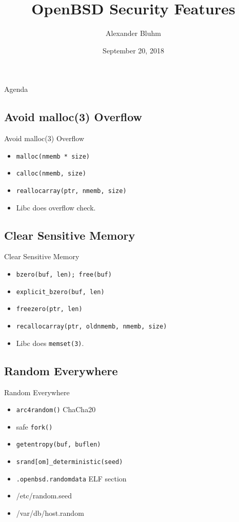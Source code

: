 \documentclass[14pt]{beamer}
\author{Alexander Bluhm}
\title{OpenBSD Security Features}
\institute{genua GmbH\\ \url{bluhm@genua.de}\\ \url{bluhm@openbsd.org}}
\date{September 20, 2018}
\begin{document}
\begin{frame}
\titlepage
\end{frame}

\begin{frame}{Agenda}
\setcounter{tocdepth}{1}
\tableofcontents
\end{frame}

\subsection{Avoid malloc(3) Overflow}
\begin{frame}{Avoid malloc(3) Overflow}
\begin{itemize}
    \item \texttt{malloc(nmemb * size)}
    \item \texttt{calloc(nmemb, size)}
    \item \texttt{reallocarray(ptr, nmemb, size)}
    \item Libc does overflow check.
\end{itemize}
\end{frame}

\subsection{Clear Sensitive Memory}
\begin{frame}{Clear Sensitive Memory}
\begin{itemize}
    \item \texttt{bzero(buf, len); free(buf)}
    \item \texttt{explicit\_bzero(buf, len)}
    \item \texttt{freezero(ptr, len)}
    \item \texttt{recallocarray(ptr, oldnmemb, nmemb, size)}
    \item Libc does \texttt{memset(3)}.
\end{itemize}
\end{frame}

\subsection{Random Everywhere}
\begin{frame}{Random Everywhere}
\begin{itemize}
    \item \texttt{arc4random()} ChaCha20
    \item safe \texttt{fork()}
    \item \texttt{getentropy(buf, buflen)}
    \item \texttt{srand[om]\_deterministic(seed)}
    \item \texttt{.openbsd.randomdata} ELF section
    \item /etc/random.seed
    \item /var/db/host.random
\end{itemize}
\end{frame}
\end{document}
